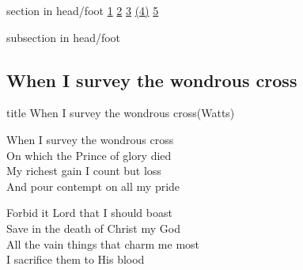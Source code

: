 \documentclass{beamer}
\begin{document}
{
{ 
 {
 \begin{beamercolorbox}[ht=4.5ex,dp=1.5ex,%
      leftskip=.3cm,rightskip=.3cm plus1fil]{section in head/foot}
 \fontsize{12}{25}\selectfont 
\hyperlink{When I survey the wondrous cross[](Watts)1}{1}
\hyperlink{When I survey the wondrous cross[](Watts)2}{2}
\hyperlink{When I survey the wondrous cross[](Watts)3}{3}
\hyperlink{When I survey the wondrous cross[](Watts)(4)}{(4)}
\hyperlink{When I survey the wondrous cross[](Watts)5}{5}
 
 \end{beamercolorbox}%
  \begin{beamercolorbox}[ht=2.5ex,dp=1.125ex,%
   leftskip=.3cm,rightskip=.3cm plus1fil]{subsection in head/foot}
   \insertauthor
 \end{beamercolorbox}%
 }
}
\subsection{ When I survey the wondrous cross }

\hypertarget{When I survey the wondrous cross[](Watts)}{}
\begin{frame}{}
 \vfill
  \centering
  \begin{beamercolorbox}[sep=8pt,center,shadow=true,rounded=true]{title}
    When I survey the wondrous cross(Watts)    
  \end{beamercolorbox}
  \vfill
\end{frame}

\hypertarget{When I survey the wondrous cross[](Watts)1}{}
\begin{frame}{}
\fontsize{ 18 }{ 23 }\selectfont

When I survey the wondrous cross\\ 
On which the Prince of glory died\\ 
My richest gain I count but loss\\ 
And pour contempt on all my pride 

\end{frame}

\hypertarget{When I survey the wondrous cross[](Watts)2}{}
\begin{frame}{}
\fontsize{ 18 }{ 23 }\selectfont

Forbid it Lord that I should boast\\ 
Save in the death of Christ my God\\ 
All the vain things that charm me most\\ 
I sacrifice them to His blood 


\end{frame}}
\end{document}
